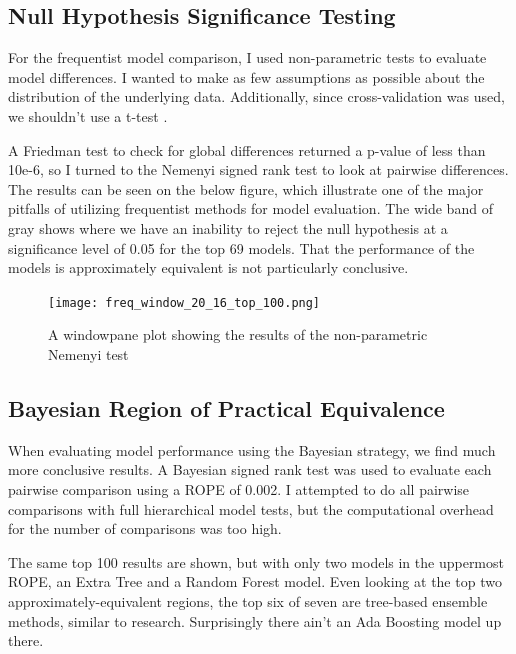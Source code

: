 \documentclass{article}
\begin{document}
    \subsection{Null Hypothesis Significance Testing}
        For the frequentist model comparison, I used non-parametric tests to evaluate model differences.
        I wanted to make as few assumptions as possible about the distribution of the underlying data.
        Additionally, since cross-validation was used, we shouldn't use a t-test \cite{why2009, eval2018}.
        
        A Friedman test \cite{scipy, eval2018} to check for global differences returned a p-value of less than 10e-6, so I turned to the Nemenyi signed rank test \cite{scipy, eval2018} to look at pairwise differences.
        The results can be seen on the below figure, which illustrate one of the major pitfalls of utilizing frequentist methods for model evaluation.
        The wide band of gray shows where we have an inability to reject the null hypothesis at a significance level of 0.05 for the top 69 models.
        That the performance of the models is approximately equivalent is not particularly conclusive. 

        \begin{figure}
            \centering
            \texttt{[image: freq\_window\_20\_16\_top\_100.png]}
            \caption{A windowpane plot showing the results of the non-parametric Nemenyi test}
            \label{fig:freq_window_20_16_top_100}
        \end{figure}

    \subsection{Bayesian Region of Practical Equivalence}
        When evaluating model performance using the Bayesian strategy, we find much more conclusive results.
        A Bayesian signed rank test \cite{stat2017, eval2018, time2017} was used to evaluate each pairwise comparison using a ROPE of 0.002.
        I attempted to do all pairwise comparisons with full hierarchical model tests, but the computational overhead for the number of comparisons was too high.
        
        The same top 100 results are shown, but with only two models in the uppermost ROPE, an Extra Tree and a Random Forest model.
        Even looking at the top two approximately-equivalent regions, the top six of seven are tree-based ensemble methods, similar to research.
        Surprisingly there ain't an Ada Boosting model up there.
\end{document}
